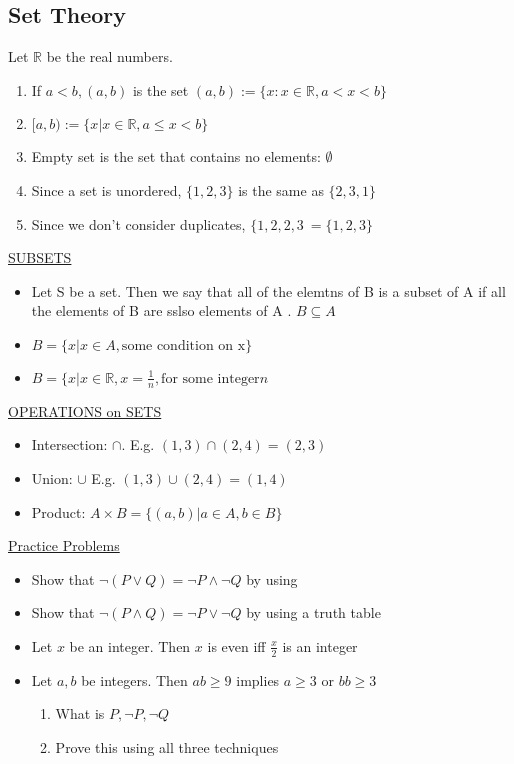 \documentclass{report}
\begin{document}
  \subsection*{Set Theory}%
    Let $\mathbb{R}$ be the real numbers.
    \begin{enumerate}
      \item If $a < b, (a,b)$ is the set $(a,b) := \{x: x \in \mathbb{R} , a < x < b \}$
      \item $[a,b) := \{x | x \in \mathbb{R} , a \leq x < b \} $
      \item Empty set is the set that contains no elements: $\emptyset$
      \item Since a set is unordered, $\{1,2,3\}$ is the same as $\{2,3,1\}$
      \item Since we don't consider duplicates, $\{1,2,2,3\ = \{1,2,3\}$
    \end{enumerate}

    \underline{SUBSETS}
    \begin{itemize}
      \item Let S be a set.  Then we say that all of the  elemtns of B is a subset of A if all the elements of B are sslso elements of A
        . $ B \subseteq A$
      \item $B = \{x | x \in A, \text{some condition on x} \}$
      \item $B = \{x | x \in \mathbb{R}, x = \frac{1}{n}, \text{for some integer} n $
    \end{itemize}

    \underline{OPERATIONS on SETS}
    \begin{itemize}
      \item Intersection: $\cap$.  E.g. $(1,3) \cap (2,4) = (2,3)$
      \item Union: $\cup$  E.g. $(1,3) \cup (2,4) = (1,4)$
      \item Product: $A \times B = \{(a,b) | a \in A, b \in B \}$
    \end{itemize}

    \underline{Practice Problems}
    \begin{itemize}
      \item Show that $\neg(P \vee Q) = \neg P \wedge  \neg Q$ by using
      \item Show that $\neg(P \wedge Q) = \neg P \vee  \neg Q$ by using
        a truth table
      \item Let $x$ be an integer.  Then  $x$ is even iff $\frac{x}{2} $ is an integer
      \item Let $a,b$ be integers.  Then $ab \geq 9$ implies $a \geq 3$ or
        $ b b\geq 3$
        \begin{enumerate}
          \item What is $P, \neg P, \neg Q$
          \item Prove this using all three techniques
        \end{enumerate}
    \end{itemize}
\end{document}
